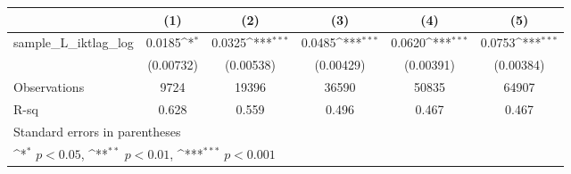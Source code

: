 {
\def\sym#1{\ifmmode^{#1}\else\(^{#1}\)\fi}
\begin{tabular}{l*{5}{c}}
\hline\hline
                &\multicolumn{1}{c}{(1)}         &\multicolumn{1}{c}{(2)}         &\multicolumn{1}{c}{(3)}         &\multicolumn{1}{c}{(4)}         &\multicolumn{1}{c}{(5)}         \\
\hline
sample\_L\_iktlag\_log&   0.0185\sym{*}  &   0.0325\sym{***}&   0.0485\sym{***}&   0.0620\sym{***}&   0.0753\sym{***}\\
                &(0.00732)         &(0.00538)         &(0.00429)         &(0.00391)         &(0.00384)         \\
\hline
Observations    &     9724         &    19396         &    36590         &    50835         &    64907         \\
R-sq            &    0.628         &    0.559         &    0.496         &    0.467         &    0.467         \\
\hline\hline
\multicolumn{6}{l}{\footnotesize Standard errors in parentheses}\\
\multicolumn{6}{l}{\footnotesize \sym{*} \(p<0.05\), \sym{**} \(p<0.01\), \sym{***} \(p<0.001\)}\\
\end{tabular}
}
